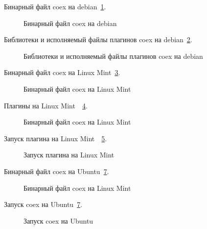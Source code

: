 Бинарный файл coex на debian~\ref{debian:debian}.

\begin{figure}[h!]
\caption{ Бинарный файл coex на debian}
\label{debian:debian}
\end{figure}

Библиотеки и исполняемый файлы плагинов coex на debian~\ref{debian2:debian2}.

\begin{figure}[h!]
\caption{ Библиотеки и исполняемый файлы плагинов coex на debian}
\label{debian2:debian2}
\end{figure}

Бинарный файл coex на Linux Mint~\ref{Linux Mint:Linux Mint}.

\begin{figure}[h!]
\caption{ Бинарный файл coex на Linux Mint}
\label{Linux Mint:Linux Mint}
\end{figure}

Плагины на Linux Mint~~\ref{Plugins:Plugins}.

\begin{figure}[h!]
\caption{ Бинарный файл coex на Linux Mint}
\label{Plugins:Plugins}
\end{figure}

Запуск плагина на Linux Mint~~\ref{Zapusk:Zapusk}.

\begin{figure}[h!]
\caption{ Запуск плагина на Linux Mint}
\label{Zapusk:Zapusk}
\end{figure}

Бинарный файл coex на Ubuntu~\ref{Ubuntu:Ubuntu}.

\begin{figure}[h!]
\caption{ Бинарный файл coex на Linux Mint}
\label{Ubuntu:Ubuntu}
\end{figure}

Запуск coex на Ubuntu~\ref{Ubuntu:Ubuntu}.

\begin{figure}[h!]
\caption{ Запуск coex на Ubuntu}
\label{Ubuntu:Ubuntu}
\end{figure}

\cite{deb_package_howto} 
\cite{deb_man} 

\clearpage











